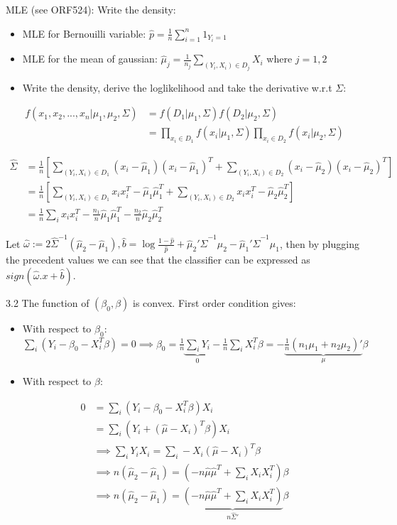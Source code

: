 \documentclass[11pt]{article}
\begin{document}
MLE (see ORF524):
Write the density:

\begin{itemize}
\item MLE for Bernouilli variable: \(\hat p = \frac1n \sum_{i=1}^n 1_{Y_i = 1}\)
\item MLE for the mean of gaussian: \(\hat \mu_j = \frac1{n_j} \sum_{(Y_i, X_i) \in D_j} X_i\) where \(j = 1,2\)
\item Write the density,  derive the loglikelihood and take the derivative w.r.t \(\Sigma\):
\end{itemize}
\begin{align*}
f(x_1, x_2,..., x_n | \mu_1, \mu_2, \Sigma) &= f(D_1 | \mu_1, \Sigma) f(D_2 | \mu_2, \Sigma)\\
&= \prod_{x_i \in D_1} f(x_i | \mu_1, \Sigma) \prod_{x_i \in D_2} f(x_i | \mu_2, \Sigma)
\end{align*}

\begin{align*}
\hat \Sigma &= \frac1n \left[ \sum_{(Y_i, X_i) \in D_1} (x_i-\hat \mu_1)(x_i-\hat \mu_1)^T +  \sum_{(Y_i, X_i) \in D_2} (x_i-\hat \mu_2)(x_i-\hat \mu_2)^T \right]
\\&= \frac1n \left[ \sum_{(Y_i, X_i) \in D_1} x_ix_i^T- \hat \mu_1\hat \mu_1^T +  \sum_{(Y_i, X_i) \in D_2} x_ix_i^T- \hat \mu_2\hat \mu_2^T  \right]
\\&= \frac1n  \sum_i x_ix_i^T - \frac{n_1}n \hat \mu_1\hat \mu_1^T - \frac{n_2}n \hat \mu_2\hat \mu_2^T
\end{align*}


Let \(\hat \omega := 2 \hat \Sigma^{-1}(\hat \mu_2 - \hat \mu_1), \hat b = \log\frac{1-\hat p}{\hat p} + \hat \mu_2'\hat \Sigma^{-1}\hat \mu_2 - \hat \mu_1'\hat \Sigma^{-1}\hat \mu_1\), then by plugging the precedent values we can see that the classifier can be expressed as \(sign(\hat \omega . x+ \hat b)\).

3.2
The function of \((\beta_0, \beta)\) is convex. First order condition gives:
\begin{itemize}
\item With respect to \(\beta_0\): \(\sum_i (Y_i - \beta_0 - X_i^T\beta) = 0 \implies \beta_0 = \frac1n \underbrace{\sum_i Y_i}_{0} - \frac1n \sum_i X_i^T \beta = -  \underbrace{\frac1n(n_1\mu_1 + n_2\mu_2)'}_{\mu}\beta\)
\item With respect to \(\beta\):
\end{itemize}
\begin{align*}
0 &= \sum_i (Y_i - \beta_0 - X_i^T\beta) X_i
\\&= \sum_i (Y_i +  (\hat \mu - X_i)^T\beta)X_i
\\&\implies \sum_i Y_i X_i = \sum_i -X_i( \hat \mu - X_i)^T\beta
\\&\implies n(\hat \mu_2 - \hat \mu_1) = \left(- n \hat \mu \hat \mu^T + \sum_i X_i X_i^T\right)\beta
\\&\implies n(\hat \mu_2 - \hat \mu_1) = \underbrace{\left(- n \hat \mu \hat \mu^T + \sum_i X_i X_i^T\right)}_{n \hat \Sigma'}\beta
\end{align*}
\end{document}

